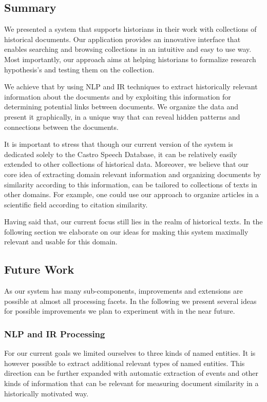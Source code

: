 \subsection {Summary}
\label{sec:summary}

We presented a system that supports historians in their work with collections of historical documents. 
Our application provides an innovative interface that enables searching and browsing collections in an intuitive and easy to use way.
Most importantly, our approach aims at helping historians to formalize research hypothesis's and testing them on the collection.

We achieve that by using NLP and IR techniques to extract historically relevant information about the documents and by exploiting
this information for determining potential links between documents. We organize the data and present it graphically,
in a unique way that can reveal hidden patterns and connections between the documents.
 
It is important to stress that though our current version of the system is dedicated solely to the Castro Speech Database, 
it can be relatively easily extended to other collections of historical data. Moreover, we believe that our core idea of
extracting domain relevant information and organizing documents by similarity according to this information, can be tailored
to collections of texts in other domains. For example, one could use our approach to organize articles in a scientific field 
according to citation similarity. 

Having said that, our current focus still lies in the realm of historical texts. In the following section we elaborate on
our ideas for making this system maximally relevant and usable for this domain. 
 

\subsection {Future Work}
\label{sec:future_work}
As our system has many sub-components, improvements and extensions are possible
at almost all processing facets. In the following we present several ideas for possible improvements we plan to experiment with in the
near future.

\subsubsection{NLP and IR Processing}
For our current goals we limited ourselves to three kinds of named entities. 
It is however possible to extract additional relevant types of named entities. 
This direction can be further expanded with automatic extraction of events and other kinds of information that can be relevant for measuring 
document similarity in a historically motivated way.  

